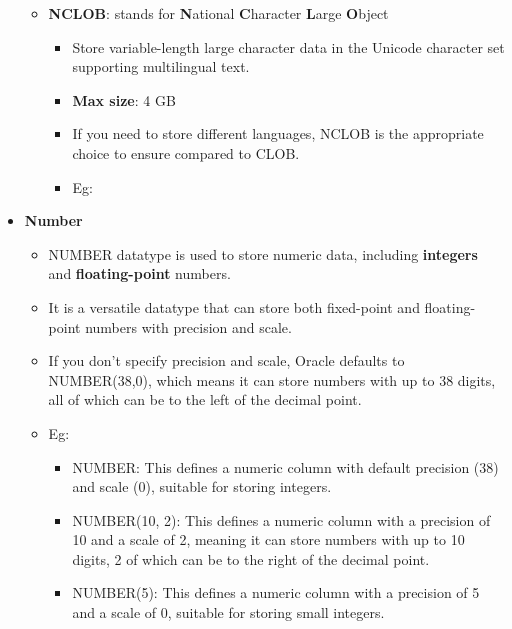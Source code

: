\begin{flushleft}
\begin{itemize}
\begin{itemize}
			\bigskip
			\item \textbf{NCLOB}: stands for \textbf{N}ational \textbf{C}haracter \textbf{L}arge \textbf{O}bject
			\bigskip
			\begin{itemize}
				\item Store variable-length large character data in the Unicode character set supporting multilingual text.
				\item \textbf{Max size}: 4 GB
				\item If you need to store different languages, NCLOB is the appropriate choice to ensure compared to CLOB.
				\item Eg:
			\end{itemize}
					
		\end{itemize}
		
		\item \textbf{Number}
		\begin{itemize}
			\item NUMBER datatype is used to store numeric data, including \textbf{integers} and \textbf{floating-point} numbers.
			\item It is a versatile datatype that can store both fixed-point and floating-point numbers with precision and scale.
			
			\item If you don't specify precision and scale, Oracle defaults to NUMBER(38,0), which means it can store numbers with up to 38 digits, all of which can be to the left of the decimal point.
		
			\item Eg:
			
			\begin{itemize}
				\item NUMBER: This defines a numeric column with default precision (38) and scale (0), suitable for storing integers.
				\item NUMBER(10, 2): This defines a numeric column with a precision of 10 and a scale of 2, meaning it can store numbers with up to 10 digits, 2 of which can be to the right of the decimal point.
				\item NUMBER(5): This defines a numeric column with a precision of 5 and a scale of 0, suitable for storing small integers.
			\end{itemize}
			\bigskip
			

\end{itemize}
\end{itemize}
\end{flushleft}
